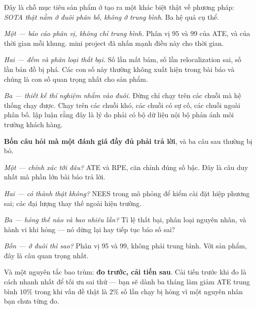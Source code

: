 \documentclass[../../vslam.tex]{subfiles}
\begin{document}
Đây là chỗ mục tiêu sản phẩm ở  tạo ra một khác biệt thật về phương pháp: \emph{SOTA thật nằm ở đuôi phân bố, không ở trung bình}. Ba hệ quả cụ thể.

\emph{Một --- báo cáo phân vị, không chỉ trung bình.} Phân vị \(95\) và \(99\) của ATE, và của thời gian mỗi khung.  mini project đã nhấn mạnh điều này cho thời gian.

\emph{Hai --- đếm và phân loại thất bại.} Số lần mất bám, số lần relocalization sai, số lần bản đồ bị phá. Các con số này thường không xuất hiện trong bài báo và chúng là con số quan trọng nhất cho sản phẩm.

\emph{Ba --- thiết kế thí nghiệm nhắm vào đuôi.} Đừng chỉ chạy trên các chuỗi mà hệ thống chạy được. Chạy trên các chuỗi khó, các chuỗi có sự cố, các chuỗi ngoài phân bố.  lập luận rằng đây là lý do phải có bộ dữ liệu nội bộ phản ánh môi trường khách hàng.

\begin{cannho}
\textbf{Bốn câu hỏi mà một đánh giá đầy đủ phải trả lời}, và ba câu sau thường bị bỏ.

\emph{Một --- chính xác tới đâu?} ATE và RPE, căn chỉnh đúng số bậc. Đây là câu duy nhất mà phần lớn bài báo trả lời.

\emph{Hai --- có thành thật không?} NEES trong mô phỏng để kiểm cài đặt hiệp phương sai; các đại lượng thay thế ngoài hiện trường.

\emph{Ba --- hỏng thế nào và bao nhiêu lần?} Tỉ lệ thất bại, phân loại nguyên nhân, và hành vi khi hỏng --- nó dừng lại hay tiếp tục báo số sai?

\emph{Bốn --- ở đuôi thì sao?} Phân vị 95 và 99, không phải trung bình. Với sản phẩm, đây là câu quan trọng nhất.

Và một nguyên tắc bao trùm: \textbf{đo trước, cải tiến sau}. Cải tiến trước khi đo là cách nhanh nhất để tối ưu sai thứ --- bạn sẽ dành ba tháng làm giảm ATE trung bình \(10\%\) trong khi vấn đề thật là \(2\%\) số lần chạy bị hỏng vì một nguyên nhân bạn chưa từng đo.
\end{cannho}

\begin{ungdung}
\end{ungdung}
\end{document}
